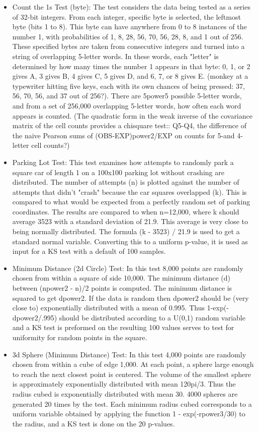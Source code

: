 \begin{itemize}
\item Count the 1s Test (byte): The test considers the data being tested as a series of 32-bit integers. From each integer, specific byte is selected, the leftmost byte (bits 1 to 8). This byte can have anywhere from 0 to 8 instances of the number 1, with probabilities of 1, 8, 28, 56, 70, 56, 28, 8, and 1 out of 256. These specified bytes are taken from consecutive integers and turned into a string of overlapping 5-letter words. In these words, each "letter" is determined by how many times the number 1 appears in that byte: 0, 1, or 2 gives A, 3 gives B, 4 gives C, 5 gives D, and 6, 7, or 8 gives E. (monkey at a typewriter hitting five keys, each with its own chances of being pressed: 37, 56, 70, 56, and 37 out of 256?). There are 5power5 possible 5-letter words, and from a set of 256,000 overlapping 5-letter words, how often each word appears is counted. (The quadratic form in the weak inverse of the covariance matrix of the cell counts provides a chisquare test::  Q5-Q4, the difference of the naive Pearson  sums of (OBS-EXP)power2/EXP on counts for 5-and 4-letter cell counts?)
\item Parking Lot Test: This test examines how attempts to randomly park a square car of length 1 on a 100x100 parking lot without crashing are distributed. The number of attempts (n) is plotted against the number of attempts that didn't "crash" because the car squares overlapped (k). This is compared to what would be expected from a perfectly random set of parking coordinates. The results are compared to when n=12,000, where k should average 3523 with a standard deviation of 21.9. This average is very close to being normally distributed. The formula (k - 3523) / 21.9 is used to get a standard normal variable. Converting this to a uniform p-value, it is used as input for a KS test with a default of 100 samples.
\item Minimum Distance (2d Circle) Test: In this test 8,000 points are randomly chosen from within a square of side 10,000. The minimum distance (d) between (npower2 - n)/2 points is computed. The minimum distance is squared to get dpower2. If the data is random then dpower2 should be (very close to) exponentially distributed with a mean of 0.995. Thus 1-exp(-dpower2/.995) should be distributed according to a U(0,1) random variable and a KS test is preformed on the resulting 100 values serves to test for uniformity for random points in the square.
\item 3d Sphere (Minimum Distance) Test: In this test 4,000 points are randomly chosen from within a cube of edge 1,000. At each point, a sphere large enough to reach the next closest point is centered. The volume of the smallest sphere is approximately exponentially distributed with mean 120pi/3. Thus the radius cubed is exponentially distributed with mean 30. 4000 spheres are generated 20 times by the test. Each minimum radius cubed corresponds to a uniform variable obtained by applying the function 1 - exp(-rpower3/30) to the radius, and a KS test is done on the 20 p-values.

\end{itemize}
